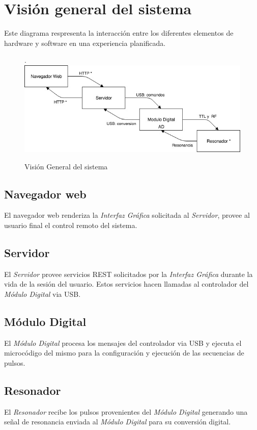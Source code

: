 \section{Visi\'on general del sistema}

Este diagrama respresenta la interacci\'on entre los diferentes elementos de hardware 
y software en una experiencia planificada.

\begin{figure}[!htb].
    \includegraphics[width=\linewidth]{../figures/d5.jpg}
    \caption{Visi\'on General del sistema}
    \label{fig:d5}
\end{figure}

\subsection{Navegador web}
El navegador web renderiza la \textit{Interfaz Gr\'afica} solicitada al \textit{Servidor}, provee al usuario final 
el control remoto del sistema.

\subsection{Servidor}
El \textit{Servidor} provee servicios REST solicitados por la \textit{Interfaz Gr\'afica} durante la vida
de la sesi\'on del usuario. Estos servicios hacen llamadas al controlador del \textit{M\'odulo
Digital} via USB.

\subsection{M\'odulo Digital}
El \textit{M\'odulo Digital} procesa los mensajes del controlador via USB y ejecuta 
el microc\'odigo del mismo para la configuraci\'on y ejecuci\'on de las secuencias de pulsos.

\subsection{Resonador}
El \textit{Resonador} recibe los pulsos provenientes del \textit{M\'odulo Digital} generando una se\~nal de resonancia
enviada al \textit{M\'odulo Digital} para su conversi\'on digital.

\newpage